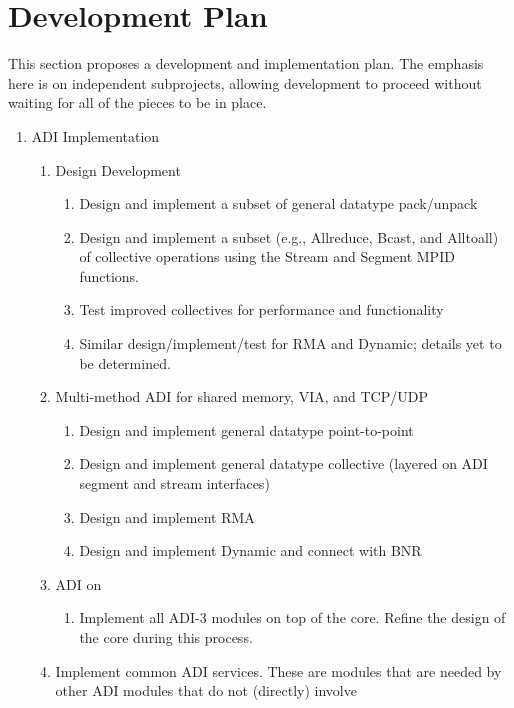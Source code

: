 \documentclass{article}
\begin{document}
\section{Development Plan}
\label{sec:development}
This section proposes a development and implementation plan.  The
emphasis here is on independent subprojects, allowing development to
proceed without waiting for all of the pieces to be in place.

\begin{enumerate}
\item ADI Implementation
    \begin{enumerate}
    \item Design Development
        \begin{enumerate}
        \item Design and implement a subset of general datatype pack/unpack
        \item Design and implement a subset (e.g., Allreduce, Bcast, and
          Alltoall) of collective operations using the Stream and Segment MPID
          functions.
        \item Test improved collectives for performance and functionality
        \item Similar design/implement/test for RMA and Dynamic; details yet
          to be determined.
        \end{enumerate}
    \item Multi-method ADI for shared memory, VIA, and TCP/UDP
        \begin{enumerate}
        \item Design and implement general datatype point-to-point
        \item Design and implement general datatype collective
        (layered on ADI segment and stream interfaces)
        \item Design and implement RMA
        \item Design and implement Dynamic and connect with BNR
        \end{enumerate}
    \item ADI on 
        \begin{enumerate}
        \item Implement all ADI-3 modules on top of the core.  Refine
        the design of the core during this process.   
        \end{enumerate}
    \item Implement common ADI services.  These are modules that are
    needed by other ADI modules that do not (directly) involve

\end{enumerate}
\end{enumerate}
\end{document}
